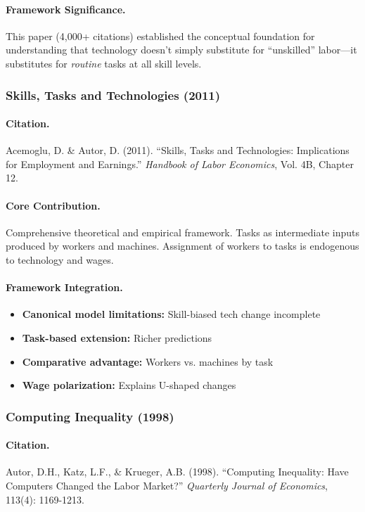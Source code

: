 \paragraph{Framework Significance.}
This paper (4,000+ citations) established the conceptual foundation for
understanding that technology doesn't simply substitute for ``unskilled''
labor---it substitutes for \emph{routine} tasks at all skill levels.

\subsubsection{Skills, Tasks and Technologies (2011)}

\paragraph{Citation.}
Acemoglu, D. \& Autor, D. (2011). ``Skills, Tasks and Technologies:
Implications for Employment and Earnings.''
\emph{Handbook of Labor Economics}, Vol. 4B, Chapter 12.

\paragraph{Core Contribution.}
Comprehensive theoretical and empirical framework. Tasks as intermediate
inputs produced by workers and machines. Assignment of workers to tasks
is endogenous to technology and wages.

\paragraph{Framework Integration.}
\begin{itemize}
  \item \textbf{Canonical model limitations:} Skill-biased tech change incomplete
  \item \textbf{Task-based extension:} Richer predictions
  \item \textbf{Comparative advantage:} Workers vs. machines by task
  \item \textbf{Wage polarization:} Explains U-shaped changes
\end{itemize}

\subsubsection{Computing Inequality (1998)}

\paragraph{Citation.}
Autor, D.H., Katz, L.F., \& Krueger, A.B. (1998). ``Computing Inequality:
Have Computers Changed the Labor Market?''
\emph{Quarterly Journal of Economics}, 113(4): 1169-1213.

